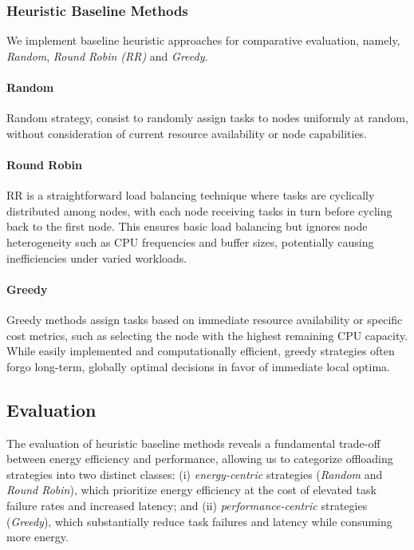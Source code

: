 \documentclass[preprint,3p,authoryear]{elsarticle}
\begin{document}
\subsubsection{Heuristic Baseline Methods}\label{subsubsec:heuristic_baselines}
We implement baseline heuristic approaches for comparative evaluation, namely, \emph{Random}, \emph{Round Robin (RR)} and \emph{Greedy}.

\paragraph{Random}
Random strategy, consist to randomly assign tasks to nodes uniformly at random, without consideration of current resource availability or node capabilities.

\paragraph{Round Robin}
RR is a straightforward load balancing technique where tasks are cyclically distributed among nodes, with each node receiving tasks in turn before cycling back to the first node. This ensures basic load balancing but ignores node heterogeneity such as CPU frequencies and buffer sizes, potentially causing inefficiencies under varied workloads. 

\paragraph{Greedy}
Greedy methods assign tasks based on immediate resource availability or specific cost metrics, such as selecting the node with the highest remaining CPU capacity. While easily implemented and computationally efficient, greedy strategies often forgo long-term, globally optimal decisions in favor of immediate local optima.


\subsection{Evaluation}

The evaluation of heuristic baseline methods reveals a fundamental trade-off between energy efficiency and performance, allowing us to categorize offloading strategies into two distinct classes: (i) \emph{energy-centric} strategies (\emph{Random} and \emph{Round Robin}), which prioritize energy efficiency at the cost of elevated task failure rates and increased latency; and (ii) \emph{performance-centric} strategies (\emph{Greedy}), which substantially reduce task failures and latency while consuming more energy.
\end{document}
